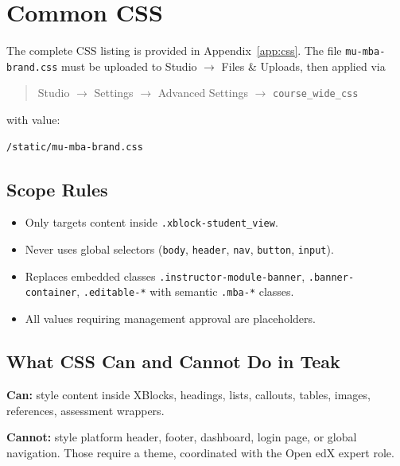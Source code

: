 \chapter{Common CSS}

The complete CSS listing is provided in Appendix~\ref{app:css}. The
file \texttt{mu-mba-brand.css} must be uploaded to Studio
$\to$ Files \& Uploads, then applied via

\begin{quote}
Studio $\to$ Settings $\to$ Advanced Settings $\to$
\texttt{course\_wide\_css}
\end{quote}

with value:

\begin{lstlisting}
/static/mu-mba-brand.css
\end{lstlisting}

\section{Scope Rules}

\begin{itemize}
  \item Only targets content inside \texttt{.xblock-student\_view}.
  \item Never uses global selectors (\texttt{body}, \texttt{header},
        \texttt{nav}, \texttt{button}, \texttt{input}).
  \item Replaces embedded classes
        \texttt{.instructor-module-banner}, \texttt{.banner-container},
        \texttt{.editable-*} with semantic \texttt{.mba-*} classes.
  \item All values requiring management approval are placeholders.
\end{itemize}

\section{What CSS Can and Cannot Do in Teak}

\textbf{Can:} style content inside XBlocks, headings, lists, callouts,
tables, images, references, assessment wrappers.

\textbf{Cannot:} style platform header, footer, dashboard, login page,
or global navigation. Those require a theme, coordinated with the
Open edX expert role.